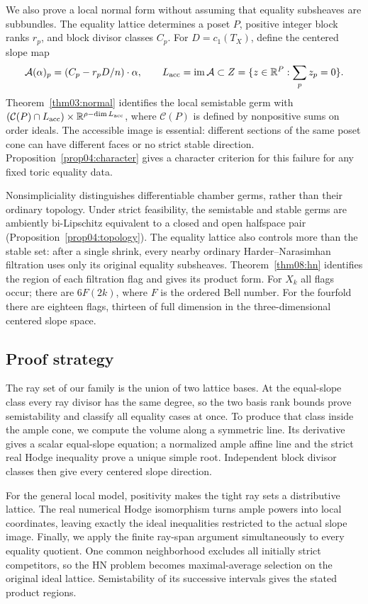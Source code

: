 \documentclass[11pt]{amsart}
\theoremstyle{definition}
\theoremstyle{remark}
\newcommand{\RR}{\mathbb R}
\newcommand{\cC}{\mathcal C}
\newcommand{\im}{\operatorname{im}}
\begin{document}
We also prove a local normal form without assuming that equality
subsheaves are subbundles. The equality lattice determines a poset
\(P\), positive integer block ranks \(r_p\), and block divisor
classes \(C_p\). For \(D=c_1(T_X)\), define the centered slope map
\[
 \mathcal A(\alpha)_p=(C_p-r_pD/n)\cdot\alpha,
 \qquad L_{\rm acc}=\im\mathcal A\subset
 Z=\{z\in\RR^P:\sum_pz_p=0\}.
\]
Theorem~\ref{thm03:normal} identifies the local semistable germ with
\((\cC(P)\cap L_{\rm acc})\times\RR^{\rho-\dim L_{\rm acc}}\),
where \(\cC(P)\) is defined by nonpositive sums on order ideals.
The accessible image is essential: different sections of the same
poset cone can have different faces or no strict stable direction.
Proposition~\ref{prop04:character} gives a character criterion for
this failure for any fixed toric equality data.

Nonsimpliciality distinguishes differentiable chamber germs, rather
than their ordinary topology. Under strict feasibility, the semistable
and stable germs are ambiently bi-Lipschitz equivalent to a closed and
open halfspace pair (Proposition~\ref{prop04:topology}). The equality
lattice also controls more than the stable set: after a single shrink,
every nearby ordinary Harder--Narasimhan filtration uses only its
original equality subsheaves. Theorem~\ref{thm08:hn} identifies the
region of each filtration flag and gives its product form. For
\(X_k\) all flags occur; there are \(6F(2k)\), where \(F\) is the
ordered Bell number. For the fourfold there are eighteen flags, thirteen
of full dimension in the three-dimensional centered slope space.

\subsection*{Proof strategy}
The ray set of our family is the union of two lattice bases. At the
equal-slope class every ray divisor has the same degree, so the two
basis rank bounds prove semistability and classify all equality
cases at once. To produce that class inside the ample cone, we compute
the volume along a symmetric line. Its derivative gives a scalar
equal-slope equation; a normalized ample affine line and the strict
real Hodge inequality prove a unique simple root. Independent block
divisor classes then give every centered slope direction.

For the general local model, positivity makes the tight ray sets a
distributive lattice. The real numerical Hodge isomorphism turns
ample powers into local coordinates, leaving exactly the ideal
inequalities restricted to the actual slope image. Finally, we apply
the finite ray-span argument simultaneously to every equality
quotient. One common neighborhood excludes all initially strict
competitors, so the HN problem becomes maximal-average selection
on the original ideal lattice. Semistability of its successive
intervals gives the stated product regions.
\end{document}
